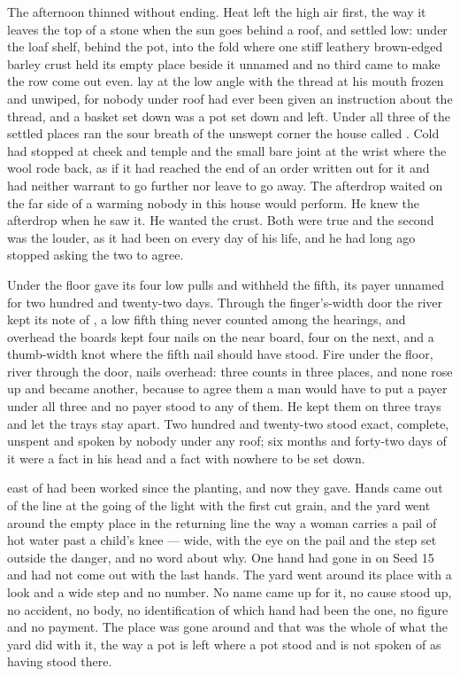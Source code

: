 The afternoon thinned without ending. Heat left the high air first, the way it leaves the top of a stone when the sun goes behind a roof, and settled low: under the loaf shelf, behind the pot, into the fold where one stiff leathery brown-edged barley crust held its empty place beside it unnamed and no third came to make the row come out even.  lay at the low angle with the thread at his mouth frozen and unwiped, for nobody under  roof had ever been given an instruction about the thread, and a basket set down was a pot set down and left. Under all three of the settled places ran the sour  breath of the unswept corner the house called . Cold had stopped at cheek and temple and the small bare joint at the wrist where the wool rode back, as if it had reached the end of an order written out for it and had neither warrant to go further nor leave to go away. The afterdrop waited on the far side of a warming nobody in this house would perform. He knew the afterdrop when he saw it. He wanted the crust. Both were true and the second was the louder, as it had been on every day of his life, and he had long ago stopped asking the two to agree.

Under the floor  gave its four low pulls and withheld the fifth, its payer unnamed for two hundred and twenty-two days. Through the finger's-width door the river kept its note of , a low fifth thing never counted among the hearings, and overhead the boards kept four nails on the near board, four on the next, and a thumb-width knot where the fifth nail should have stood. Fire under the floor, river through the door, nails overhead: three counts in three places, and none rose up and became another, because to agree them a man would have to put a payer under all three and no payer stood to any of them. He kept them on three trays and let the trays stay apart. Two hundred and twenty-two stood exact, complete, unspent and spoken by nobody under any roof; six months and forty-two days of it were a fact in his head and a fact with nowhere to be set down.

 east of  had been worked since the planting, and now they gave. Hands came out of the line at the going of the light with the first cut grain, and the yard went around the empty place in the returning line the way a woman carries a pail of hot water past a child's knee --- wide, with the eye on the pail and the step set outside the danger, and no word about why. One hand had gone in on Seed 15 and had not come out with the last hands. The yard went around its place with a look and a wide step and no number. No name came up for it, no cause stood up, no accident, no body, no identification of which hand had been the one, no figure and no payment. The place was gone around and that was the whole of what the yard did with it, the way a pot is left where a pot stood and is not spoken of as having stood there.


